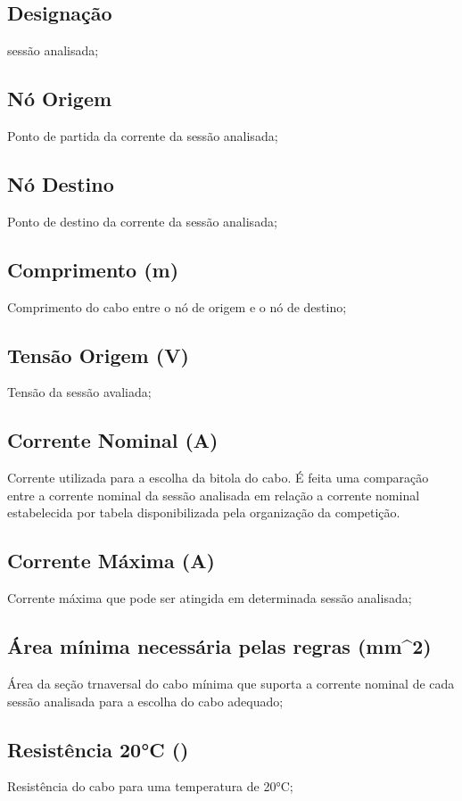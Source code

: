 \documentclass{article}
\begin{document}
\subsection{Designação}
sessão analisada;

\subsection{Nó Origem}
Ponto de partida da corrente da sessão analisada;

\subsection{Nó Destino}
Ponto de destino da corrente da sessão analisada;

\subsection{Comprimento (m)}
Comprimento do cabo entre o nó de origem e o nó de destino;

\subsection{Tensão Origem (V)}
Tensão da sessão avaliada;

\subsection{Corrente Nominal (A)}
Corrente utilizada para a escolha da bitola do cabo. É feita uma comparação entre a corrente nominal da sessão analisada em relação a corrente nominal estabelecida por tabela disponibilizada pela organização da competição.

\subsection{Corrente Máxima (A)}
Corrente máxima que pode ser atingida em determinada sessão analisada;

\subsection{Área mínima necessária pelas regras (mm^2)}
Área da seção trnaversal do cabo mínima que suporta a corrente nominal de cada sessão analisada para a escolha do cabo adequado;

\subsection{Resistência 20°C (\Omega)}
Resistência do cabo para uma temperatura de 20°C;
\end{document}

